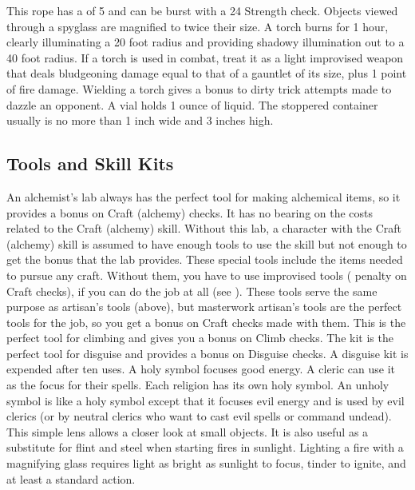          This rope has a  of 5 and can be burst with a  24 Strength check.
         Objects viewed through a spyglass are magnified to twice their size.
         A torch burns for 1 hour, clearly illuminating a 20 foot radius and providing shadowy illumination out to a 40 foot radius. If a torch is used in combat, treat it as a light improvised weapon that deals bludgeoning damage equal to that of a gauntlet of its size, plus 1 point of fire damage. Wielding a torch gives a  bonus to dirty trick attempts made to dazzle an opponent.
         A vial holds 1 ounce of liquid. The stoppered container usually is no more than 1 inch wide and 3 inches high.

    \subsection{Tools and Skill Kits}
         An alchemist's lab always has the perfect tool for making alchemical items, so it provides a  bonus on Craft (alchemy) checks. It has no bearing on the costs related to the Craft (alchemy) skill. Without this lab, a character with the Craft (alchemy) skill is assumed to have enough tools to use the skill but not enough to get the  bonus that the lab provides.
         These special tools include the items needed to pursue any craft. Without them, you have to use improvised tools ( penalty on Craft checks), if you can do the job at all (see ).
         These tools serve the same purpose as artisan's tools (above), but masterwork artisan's tools are the perfect tools for the job, so you get a  bonus on Craft checks made with them.
         This is the perfect tool for climbing and gives you a  bonus on Climb checks.
         The kit is the perfect tool for disguise and provides a  bonus on Disguise checks. A disguise kit is expended after ten uses.
         A holy symbol focuses good energy. A cleric can use it as the focus for their spells. Each religion has its own holy symbol.
         An unholy symbol is like a holy symbol except that it focuses evil energy and is used by evil clerics (or by neutral clerics who want to cast evil spells or command undead).
         This simple lens allows a closer look at small objects. It is also useful as a substitute for flint and steel when starting fires in sunlight. Lighting a fire with a magnifying glass requires light as bright as sunlight to focus, tinder to ignite, and at least a standard action.
